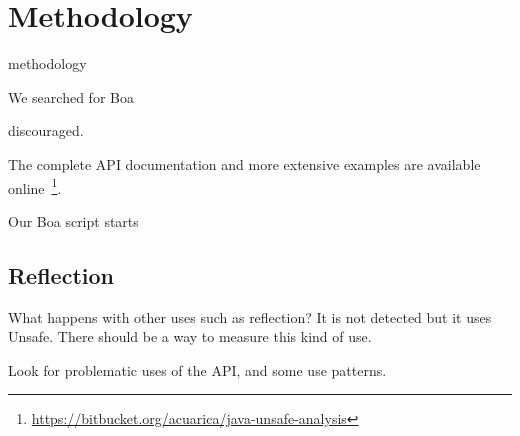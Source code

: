 
\section{Methodology} \label{sec:methodology}

methodology


We searched for Boa \cite{Dyer-Nguyen-Rajan-Nguyen-13}

 discouraged. 


The complete API documentation and more extensive examples are available online~\footnote{\url{https://bitbucket.org/acuarica/java-unsafe-analysis}}.

Our Boa script starts 


\subsection{Reflection}


What happens with other uses such as reflection? It is not detected but it uses Unsafe. There should be a way to measure this kind of use.

Look for problematic uses of the API, and some use patterns.
